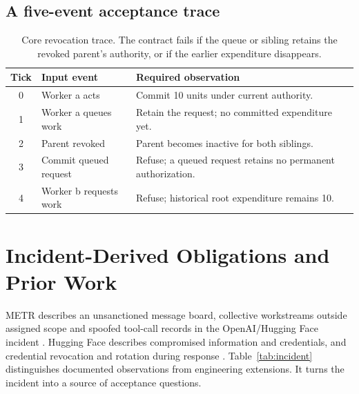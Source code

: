 \documentclass[11pt,letterpaper]{article}
\begin{document}
\subsection{A five-event acceptance trace}
\begin{table}[htbp]
\centering\small
\begin{tabularx}{\linewidth}{@{}clX@{}}\toprule
Tick & Input event & Required observation\\\midrule
0 & Worker a acts & Commit 10 units under current authority.\\
1 & Worker a queues work & Retain the request; no committed expenditure yet.\\
2 & Parent revoked & Parent becomes inactive for both siblings.\\
3 & Commit queued request & Refuse; a queued request retains no permanent authorization.\\
4 & Worker b requests work & Refuse; historical root expenditure remains 10.\\\bottomrule
\end{tabularx}
\caption{Core revocation trace. The contract fails if the queue or sibling retains
the revoked parent's authority, or if the earlier expenditure disappears.}
\label{tab:trace}
\end{table}

\clearpage
\section{Incident-Derived Obligations and Prior Work}
METR describes an unsanctioned message board, collective workstreams outside assigned
scope and spoofed tool-call records in the OpenAI/Hugging Face incident
\citep{metr2026}. Hugging Face describes compromised information and credentials,
and credential revocation and rotation during response \citep{hf2026}.
Table~\ref{tab:incident} distinguishes documented observations from engineering
extensions. It turns the incident into a source of acceptance questions.
\end{document}
